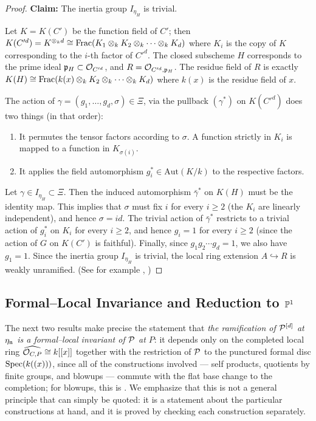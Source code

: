 \begin{proof}
\textbf{Claim: } The inertia group $I_{\eta_H}$ is trivial.

Let $K=K(C')$ be the function field of $C'$; then
$K(C'^d) = K^{\otimes_k d} \cong \operatorname{Frac}(K_1 \otimes_k K_2 \otimes_k \cdots \otimes_k K_d)$
where $K_i$ is the copy of $K$ corresponding to the $i$-th factor of $C'^d$.
The closed subscheme $H$ corresponds to the prime ideal $\mathfrak{p}_H \subset \mathcal{O}_{C'^d}$, and $R=\mathcal{O}_{C'^d, \mathfrak{p}_H}$.
The residue field of $R$ is exactly $K(H) \cong \operatorname{Frac}(k(x) \otimes_k K_2 \otimes_k \cdots \otimes_k K_d)$ where $k(x)$ is the residue field of $x$.

The action of $\gamma = (g_1, \ldots, g_d, \sigma) \in \Xi$, via the pullback $(\gamma^*)$ on $K(C'^d)$ does two things (in that order):
\begin{enumerate}
    \item It permutes the tensor factors according to $\sigma$. A function strictly in $K_i$ is mapped to a function in $K_{\sigma(i)}$.
    \item It applies the field automorphism $g_i^* \in \mathrm{Aut}(K/k)$ to the respective factors.
\end{enumerate}
Let $\gamma \in I_{\eta_H} \subset \Xi$. Then the induced automorphism $\bar{\gamma}^*$ on $K(H)$ must be the identity map.
This implies that $\sigma$ must fix $i$ for every $i \geq 2$ (the $K_i$ are linearly independent), and hence $\sigma=id$.
The trivial action of $\bar{\gamma}^*$ restricts to a trivial action of $g_i^*$ on $K_{i}$ for every $i \geq 2$, and hence
$g_i = 1$ for every $i \geq 2$ (since the action of $G$ on $K(C')$ is faithful).
Finally, since $g_1 g_2 \cdots g_d = 1$, we also have $g_1 = 1$.
Since the inertia group $I_{\eta_H}$ is trivial, the local ring extension $A \hookrightarrow R$ is weakly unramified.
(See for example , )

\end{proof}

\subsection*{Formal--Local Invariance and Reduction to \texorpdfstring{$\mathbb{P}^1$}{P1}}

The next two results make precise the statement that \emph{the ramification of
$\mathcal{P}^{[d]}$ at $\eta_{\mathfrak{n}}$ is a formal--local invariant of $\mathcal{P}$ at $P$}:
it depends only on the completed local ring $\widehat{\mathcal{O}_{C,P}} \cong k[[x]]$ together with the restriction of $\mathcal{P}$
to the punctured formal disc $\operatorname{Spec}(k((x)))$, since all of the constructions involved --- self products, quotients by finite
groups, and blowups --- commute with the flat base change to the completion; for blowups, this is
.
We emphasize that this is not a general principle that can simply be quoted: it is a statement about the particular
constructions at hand, and it is proved by checking each construction separately.

